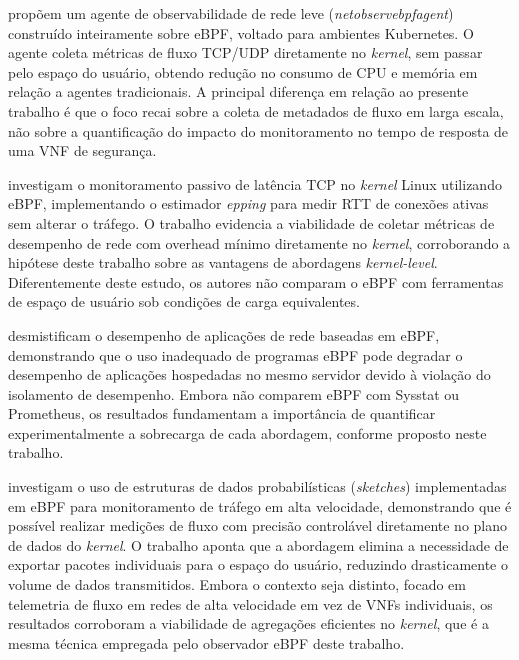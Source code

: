  propõem um agente de observabilidade de rede leve (\textit{netobserv\discretionary{-}{}{}ebpf\discretionary{-}{}{}agent}) construído inteiramente sobre eBPF, voltado para ambientes Kubernetes. O agente coleta métricas de fluxo TCP/UDP diretamente no \textit{kernel}, sem passar pelo espaço do usuário, obtendo redução no consumo de CPU e memória em relação a agentes tradicionais. A principal diferença em relação ao presente trabalho é que o foco recai sobre a coleta de metadados de fluxo em larga escala, não sobre a quantificação do impacto do monitoramento no tempo de resposta de uma VNF de segurança.

 investigam o monitoramento passivo de latência TCP no \textit{kernel} Linux utilizando eBPF, implementando o estimador \textit{epping} para medir RTT de conexões ativas sem alterar o tráfego. O trabalho evidencia a viabilidade de coletar métricas de desempenho de rede com overhead mínimo diretamente no \textit{kernel}, corroborando a hipótese deste trabalho sobre as vantagens de abordagens \textit{kernel-level}. Diferentemente deste estudo, os autores não comparam o eBPF com ferramentas de espaço de usuário sob condições de carga equivalentes.

 desmistificam o desempenho de aplicações de rede baseadas em eBPF, demonstrando que o uso inadequado de programas eBPF pode degradar o desempenho de aplicações hospedadas no mesmo servidor devido à violação do isolamento de desempenho. Embora não comparem eBPF com Sysstat ou Prometheus, os resultados fundamentam a importância de quantificar experimentalmente a sobrecarga de cada abordagem, conforme proposto neste trabalho.

 investigam o uso de estruturas de dados probabilísticas (\textit{sketches}) implementadas em eBPF para monitoramento de tráfego em alta velocidade, demonstrando que é possível realizar medições de fluxo com precisão controlável diretamente no plano de dados do \textit{kernel}. O trabalho aponta que a abordagem elimina a necessidade de exportar pacotes individuais para o espaço do usuário, reduzindo drasticamente o volume de dados transmitidos. Embora o contexto seja distinto, focado em telemetria de fluxo em redes de alta velocidade em vez de VNFs individuais, os resultados corroboram a viabilidade de agregações eficientes no \textit{kernel}, que é a mesma técnica empregada pelo observador eBPF deste trabalho.

